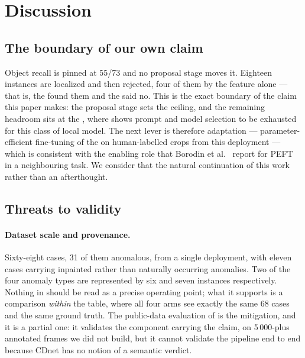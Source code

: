 \section{Discussion}
\label{sec:discussion}

\subsection{The boundary of our own claim}

Object recall is pinned at 55/73 and no proposal stage moves it. Eighteen
instances are localized and then rejected, four of them by the feature
\proposer{} alone --- that is, the \proposer{} found them and the \judge{}
said no. This is the exact boundary of the claim this paper makes: the
proposal stage sets the ceiling, and the remaining headroom sits at the
\judge{}, where  shows prompt and model selection to be
exhausted for this class of local model. The next lever is therefore
adaptation --- parameter-efficient fine-tuning of the \judge{} on human-labelled
crops from this deployment --- which is consistent with the enabling role that
Borodin et al.~\cite{Borodin_2025} report for PEFT in a neighbouring task. We
consider that the natural continuation of this work rather than an afterthought.

\subsection{Threats to validity}

\paragraph{Dataset scale and provenance.}
Sixty-eight cases, 31 of them anomalous, from a single deployment, with eleven
cases carrying inpainted rather than naturally occurring anomalies. Two of the
four anomaly types are represented by six and seven instances respectively.
Nothing in  should be read as a precise operating
point; what it supports is a comparison \emph{within} the table, where all four
arms see exactly the same 68 cases and the same ground truth. The
public-data evaluation of  is the mitigation, and it
is a partial one: it validates the component carrying the claim, on 5\,000-plus
annotated frames we did not build, but it cannot validate the pipeline
end to end because CDnet has no notion of a semantic verdict.

